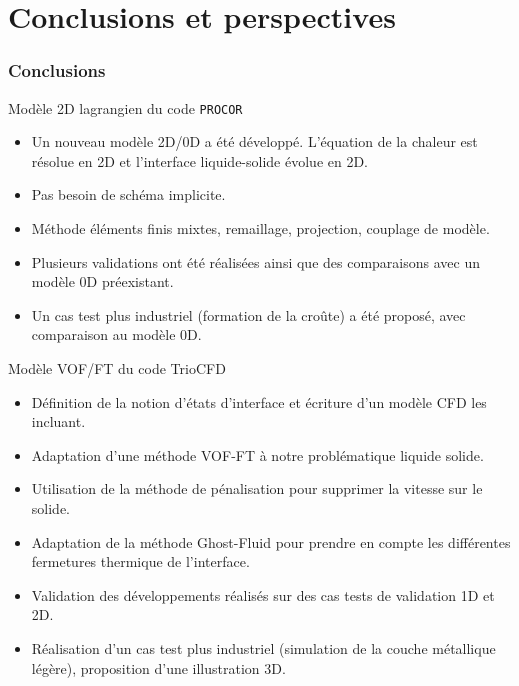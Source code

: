 \documentclass{beamer}
\newcommand{\procor}{\texttt{PROCOR}}
\begin{document}
\section{Conclusions et perspectives}

\begin{frame}
    \frametitle{Conclusions}
    \scriptsize
    \begin{ceablock}{Modèle 2D lagrangien du code \procor}
        \begin{itemize}
            \item Un nouveau modèle 2D/0D a été développé. L'équation de la chaleur est résolue en 2D et l'interface liquide-solide évolue en 2D.
            \item Pas besoin de schéma implicite.
            \item Méthode éléments finis mixtes, remaillage, projection, couplage de modèle.
            \item Plusieurs validations ont été réalisées ainsi que des comparaisons avec un modèle 0D préexistant.
            \item Un cas test plus industriel (formation de la croûte) a été proposé, avec comparaison au modèle 0D.
        \end{itemize}
    \end{ceablock}
    
     \begin{ceablock}{Modèle VOF/FT du code TrioCFD}
        \begin{itemize}
        	\item Définition de la notion d'états d'interface et écriture d'un modèle CFD les incluant.
            \item Adaptation d'une méthode VOF-FT à notre problématique liquide solide.
            \item Utilisation de la méthode de pénalisation pour supprimer la vitesse sur le solide.
            \item Adaptation de la méthode Ghost-Fluid pour prendre en compte les différentes fermetures thermique de l'interface.
            \item Validation des développements réalisés sur des cas tests de validation 1D et 2D.
            \item Réalisation d'un cas test plus industriel (simulation de la couche métallique légère), proposition d'une illustration 3D.
        \end{itemize}
    \end{ceablock}

\end{frame}
\end{document}
